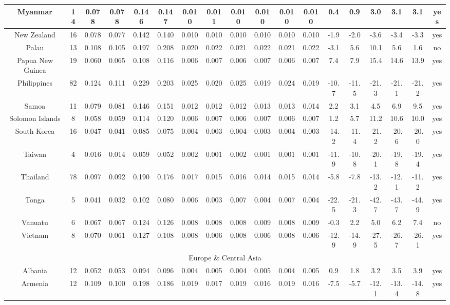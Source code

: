 \documentclass[10pt]{article}
\begin{document}
\begin{center}
\begin{tabular}{|c|c|c|c|c|c|c|c|c|c|c|c|c|c|c|c|c|c|}
\hline
Myanmar & 14 & 0.078 & 0.078 & 0.146 & 0.147 & 0.010 & 0.011 & 0.010 & 0.010 & 0.010 & 0.010 & 0.4 & 0.9 & 3.0 & 3.1 & 3.1 & yes \\
\hline
New Zealand & 16 & 0.078 & 0.077 & 0.142 & 0.140 & 0.010 & 0.010 & 0.010 & 0.010 & 0.010 & 0.010 & -1.9 & -2.0 & -3.6 & -3.4 & -3.3 & yes \\
\hline
Palau & 13 & 0.108 & 0.105 & 0.197 & 0.208 & 0.020 & 0.022 & 0.021 & 0.022 & 0.021 & 0.022 & -3.1 & 5.6 & 10.1 & 5.6 & 1.6 & no \\
\hline
Papua New Guinea & 19 & 0.060 & 0.065 & 0.108 & 0.116 & 0.006 & 0.007 & 0.006 & 0.007 & 0.006 & 0.007 & 7.4 & 7.9 & 15.4 & 14.6 & 13.9 & yes \\
\hline
Philippines & 82 & 0.124 & 0.111 & 0.229 & 0.203 & 0.025 & 0.020 & 0.025 & 0.019 & 0.024 & 0.019 & -10.7 & -11.5 & -21.3 & -21.1 & -21.2 & yes \\
\hline
Samoa & 11 & 0.079 & 0.081 & 0.146 & 0.151 & 0.012 & 0.012 & 0.012 & 0.013 & 0.013 & 0.014 & 2.2 & 3.1 & 4.5 & 6.9 & 9.5 & yes \\
\hline
Solomon Islands & 8 & 0.058 & 0.059 & 0.114 & 0.120 & 0.006 & 0.007 & 0.006 & 0.007 & 0.006 & 0.007 & 1.2 & 5.7 & 11.2 & 10.6 & 10.0 & yes \\
\hline
South Korea & 16 & 0.047 & 0.041 & 0.085 & 0.075 & 0.004 & 0.003 & 0.004 & 0.003 & 0.004 & 0.003 & -14.2 & -11.4 & -21.2 & -20.6 & -20.0 & yes \\
\hline
Taiwan & 4 & 0.016 & 0.014 & 0.059 & 0.052 & 0.002 & 0.001 & 0.002 & 0.001 & 0.001 & 0.001 & -11.9 & -10.8 & -20.1 & -19.8 & -19.4 & yes \\
\hline
Thailand & 78 & 0.097 & 0.092 & 0.190 & 0.176 & 0.017 & 0.015 & 0.016 & 0.014 & 0.015 & 0.014 & -5.8 & -7.8 & -13.2 & -12.1 & -11.2 & yes \\
\hline
Tonga & 5 & 0.041 & 0.032 & 0.102 & 0.080 & 0.006 & 0.003 & 0.007 & 0.004 & 0.007 & 0.004 & -22.5 & -21.3 & -42.7 & -43.7 & -44.9 & yes \\
\hline
Vanuatu & 6 & 0.067 & 0.067 & 0.124 & 0.126 & 0.008 & 0.008 & 0.008 & 0.009 & 0.008 & 0.009 & -0.3 & 2.2 & 5.0 & 6.2 & 7.4 & no \\
\hline
Vietnam & 8 & 0.070 & 0.061 & 0.127 & 0.108 & 0.008 & 0.006 & 0.008 & 0.006 & 0.008 & 0.006 & -12.9 & -14.9 & -27.5 & -26.7 & -26.1 & yes \\
\hline
\multicolumn{18}{|c|}{Europe \& Central Asia} \\
\hline
Albania & 12 & 0.052 & 0.053 & 0.094 & 0.096 & 0.004 & 0.005 & 0.004 & 0.005 & 0.004 & 0.005 & 0.9 & 1.8 & 3.2 & 3.5 & 3.9 & yes \\
\hline
Armenia & 12 & 0.109 & 0.100 & 0.198 & 0.186 & 0.019 & 0.017 & 0.019 & 0.016 & 0.019 & 0.016 & -7.5 & -5.7 & -12.1 & -13.4 & -14.8 & yes \\
\hline
\end{tabular}
\end{center}
\end{document}
